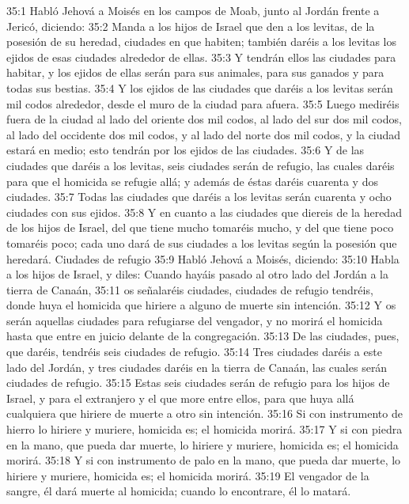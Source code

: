35:1 Habló Jehová a Moisés en los campos de Moab, junto al Jordán frente a Jericó, diciendo:  
35:2 Manda a los hijos de Israel que den a los levitas, de la posesión de su heredad, ciudades en que habiten; también daréis a los levitas los ejidos de esas ciudades alrededor de ellas.  
35:3 Y tendrán ellos las ciudades para habitar, y los ejidos de ellas serán para sus animales, para sus ganados y para todas sus bestias.  
35:4 Y los ejidos de las ciudades que daréis a los levitas serán mil codos   alrededor, desde el muro de la ciudad para afuera.  
35:5 Luego mediréis fuera de la ciudad al lado del oriente dos mil codos, al lado del sur dos mil codos, al lado del occidente dos mil codos, y al lado del norte dos mil codos, y la ciudad estará en medio; esto tendrán por los ejidos de las ciudades.  
35:6 Y de las ciudades que daréis a los levitas, seis ciudades serán de refugio, las cuales daréis para que el homicida se refugie allá; y además de éstas daréis cuarenta y dos ciudades.  
35:7 Todas las ciudades que daréis a los levitas serán cuarenta y ocho ciudades con sus ejidos.  
35:8 Y en cuanto a las ciudades que diereis de la heredad de los hijos de Israel, del que tiene mucho tomaréis mucho, y del que tiene poco tomaréis poco; cada uno dará de sus ciudades a los levitas según la posesión que heredará.  
Ciudades de refugio   
35:9 Habló Jehová a Moisés, diciendo:  
35:10 Habla a los hijos de Israel, y diles: Cuando hayáis pasado al otro lado del Jordán a la tierra de Canaán,  
35:11 os señalaréis ciudades, ciudades de refugio tendréis, donde huya el homicida que hiriere a alguno de muerte sin intención.  
35:12 Y os serán aquellas ciudades para refugiarse del vengador, y no morirá el homicida hasta que entre en juicio delante de la congregación.  
35:13 De las ciudades, pues, que daréis, tendréis seis ciudades de refugio.  
35:14 Tres ciudades daréis a este lado del Jordán, y tres ciudades daréis en la tierra de Canaán, las cuales serán ciudades de refugio.  
35:15 Estas seis ciudades serán de refugio para los hijos de Israel, y para el extranjero y el que more entre ellos, para que huya allá cualquiera que hiriere de muerte a otro sin intención.  
35:16 Si con instrumento de hierro lo hiriere y muriere, homicida es; el homicida morirá.  
35:17 Y si con piedra en la mano, que pueda dar muerte, lo hiriere y muriere, homicida es; el homicida morirá.  
35:18 Y si con instrumento de palo en la mano, que pueda dar muerte, lo hiriere y muriere, homicida es; el homicida morirá.  
35:19 El vengador de la sangre, él dará muerte al homicida; cuando lo encontrare, él lo matará.  
